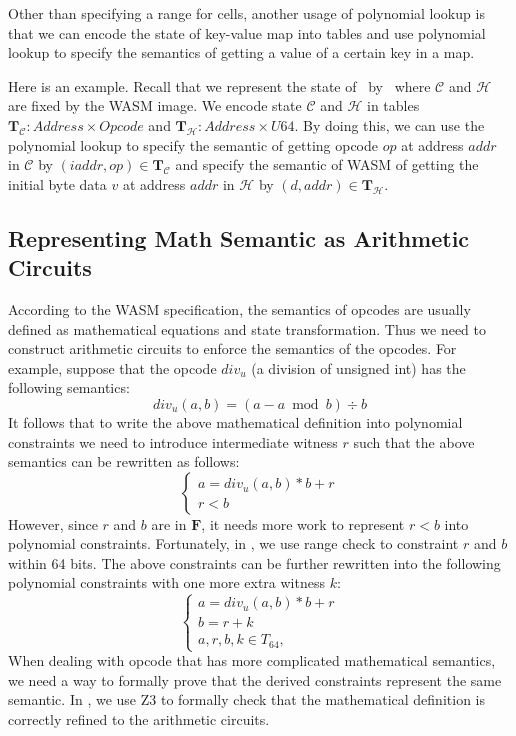 Other than specifying a range for cells, another usage of polynomial lookup is that we can encode the state of key-value map into tables and use polynomial lookup to specify the semantics of getting a value of a certain key in a map. 

Here is an example. Recall that we represent the state of \zkwasm\, by \fullstate \, where $\mathcal{C}$ and $\mathcal{H}$ are fixed by the WASM image. We encode state $\mathcal{C}$ and $\mathcal{H}$ in tables $\mathbf{T}_\mathcal{C} : Address \times Opcode$ and $\mathbf{T}_\mathcal{H}: Address \times U64$. By doing this, we can use the polynomial lookup to specify the semantic of getting opcode $op$ at address $addr$ in $\mathcal{C}$ by $(iaddr, op) \in \mathbf{T}_\mathcal{C}$ and specify the semantic of WASM of getting the initial byte data $v$ at address $addr$ in $\mathcal{H}$ by $(d, addr) \in \mathbf{T}_\mathcal{H}$.

\subsection{Representing Math Semantic as Arithmetic Circuits}
According to the WASM specification, the semantics of opcodes are usually defined as mathematical equations and state transformation. Thus we need to construct arithmetic circuits to enforce the semantics of the opcodes. For example, suppose that the opcode $div_u$ (a division of unsigned int) has the following semantics:
\[ div_u(a, b) = (a - a \bmod b) \div b \] 
It follows that to write the above mathematical definition into polynomial constraints we need to introduce intermediate witness $r$ such that the above semantics can be rewritten as follows:
\begin{equation}
\begin{cases}
    a = div_u(a,b) * b + r \\
    r < b
\end{cases}
\end{equation}
However, since $r$ and $b$ are in $\mathbf{F}$, it needs more work to represent $r < b$ into polynomial constraints. Fortunately, in \zkwasm, we use range check to constraint $r$ and $b$ within 64 bits. The above constraints can be further rewritten into the following polynomial constraints with one more extra witness $k$: 
\begin{equation}
\begin{cases}
    a = div_u(a,b) * b + r \\
    b = r + k \\
    a, r, b, k\in T_{64}, 
\end{cases}
\end{equation}
When dealing with opcode that has more complicated mathematical semantics, we need a way to formally prove that the derived constraints represent the same semantic. In \zkwasm, we use Z3 to formally check that the mathematical definition is correctly refined to the arithmetic circuits.

